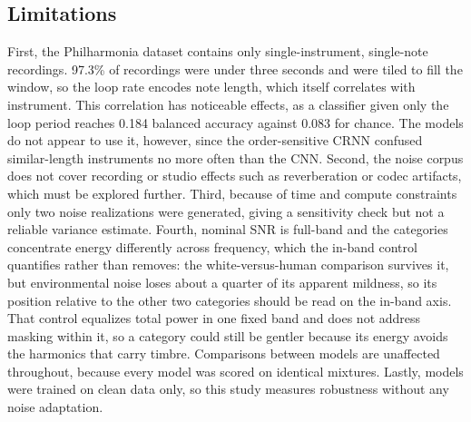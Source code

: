 \documentclass[conference]{IEEEtran}
\begin{document}
\subsection{Limitations}
\label{sec:limitations}
First, the Philharmonia dataset contains only single-instrument, single-note recordings. 97.3\% of recordings were under three seconds and were tiled to fill the window, so the loop rate encodes note length, which itself correlates with instrument. This correlation has noticeable effects, as a classifier given only the loop period reaches 0.184 balanced accuracy against 0.083 for chance. The models do not appear to use it, however, since the order-sensitive CRNN confused similar-length instruments no more often than the CNN. Second, the noise corpus does not cover recording or studio effects such as reverberation or codec artifacts, which must be explored further. Third, because of time and compute constraints only two noise realizations were generated, giving a sensitivity check but not a reliable variance estimate. Fourth, nominal SNR is full-band and the categories concentrate energy differently across frequency, which the in-band control quantifies rather than removes: the white-versus-human comparison survives it, but environmental noise loses about a quarter of its apparent mildness, so its position relative to the other two categories should be read on the in-band axis. That control equalizes total power in one fixed band and does not address masking within it, so a category could still be gentler because its energy avoids the harmonics that carry timbre. Comparisons between models are unaffected throughout, because every model was scored on identical mixtures. Lastly, models were trained on clean data only, so this study measures robustness without any noise adaptation.
\end{document}
